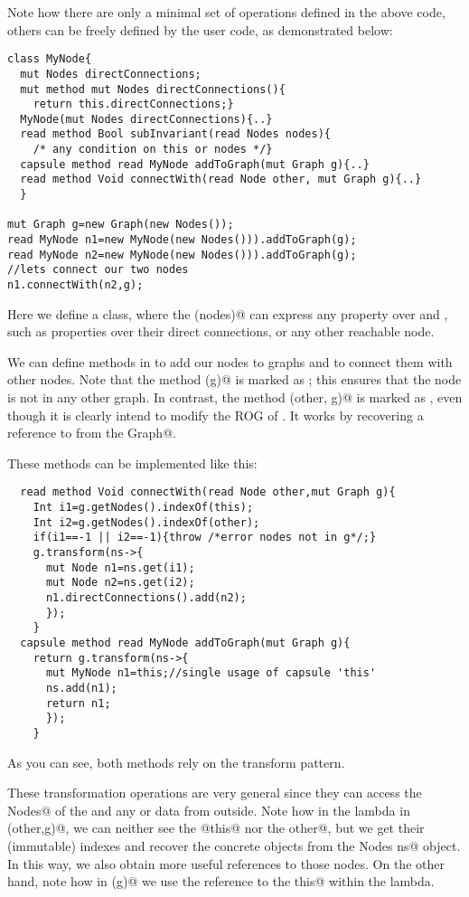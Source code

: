 Note how there are only a minimal set of operations defined in the above code, %
others can be freely defined by the user code, as demonstrated below:

\begin{lstlisting}
class MyNode{
  mut Nodes directConnections;
  mut method mut Nodes directConnections(){
    return this.directConnections;}
  MyNode(mut Nodes directConnections){..}
  read method Bool subInvariant(read Nodes nodes){
    /* any condition on this or nodes */}  
  capsule method read MyNode addToGraph(mut Graph g){..}
  read method Void connectWith(read Node other, mut Graph g){..}
  }

mut Graph g=new Graph(new Nodes());
read MyNode n1=new MyNode(new Nodes())).addToGraph(g);
read MyNode n2=new MyNode(new Nodes())).addToGraph(g);
//lets connect our two nodes
n1.connectWith(n2,g);
\end{lstlisting}
Here we define a \Q@MyNode@ class, where the \Q@subInvariant(nodes)@ can express any property over \Q@this@ and \Q@nodes@, such as properties over their direct connections, or any other reachable node.

We can define methods in \Q@MyNode@ to add our nodes
to graphs and to connect them with other nodes.
Note that the method \Q@addToGraph(g)@ is marked as \Q@capsule@; this ensures that the node is not in any other graph.
In contrast, the method \Q@connectWith(other, g)@ is marked as \Q@read@, even though it is clearly intend to modify the ROG of \Q@this@.
It works by recovering a \Q@mut@ reference to \Q@this@ from the \Q@mut Graph@.

These methods can be implemented like this:
\begin{lstlisting}
  read method Void connectWith(read Node other,mut Graph g){
    Int i1=g.getNodes().indexOf(this);
    Int i2=g.getNodes().indexOf(other);
    if(i1==-1 || i2==-1){throw /*error nodes not in g*/;}
    g.transform(ns->{
      mut Node n1=ns.get(i1);
      mut Node n2=ns.get(i2);
      n1.directConnections().add(n2);
      });
    }
  capsule method read MyNode addToGraph(mut Graph g){
    return g.transform(ns->{
      mut MyNode n1=this;//single usage of capsule 'this'
      ns.add(n1);
      return n1;
      });
    }
\end{lstlisting}
As you can see, both methods rely on the transform pattern.

These transformation operations are very general since they
can access the \Q@mut Nodes@ of the \Q@Graph@ and 
any \Q@capsule@ or \Q@imm@ data from outside.
Note how in the lambda in \Q@connectWith(other,g)@, we can neither see the \Q@read@ @this@ nor the \Q@read other@, but we get their (immutable) indexes 
and recover the concrete objects from the \Q@mut Nodes ns@ object.
In this way, we also obtain more useful \Q@mut@ references to those nodes.
On the other hand, note how in \Q@addToGraph(g)@ we use the reference to the \Q@capsule this@ within the lambda.


